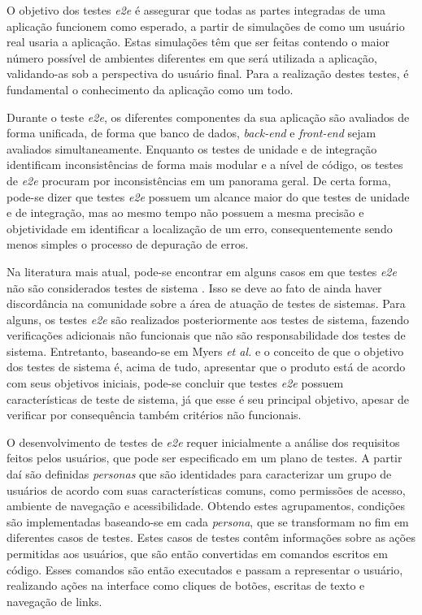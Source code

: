 O objetivo dos testes \emph{e2e} é assegurar que todas as partes integradas de uma aplicação funcionem como esperado, a partir de simulações de como um usuário real usaria a aplicação. Estas simulações têm que ser feitas contendo o maior número possível de ambientes diferentes em que será utilizada a aplicação, validando-as sob a perspectiva do usuário final. Para a realização destes testes, é fundamental o conhecimento da aplicação como um todo.

Durante o teste \emph{e2e}, os diferentes componentes da sua aplicação são avaliados de forma unificada, de forma que banco de dados, \emph{back-end} e \emph{front-end} sejam avaliados simultaneamente. Enquanto os testes de unidade e de integração identificam inconsistências de forma mais modular e a nível de código, os testes de \emph{e2e} procuram por inconsistências em um panorama geral. De certa forma, pode-se dizer que testes \emph{e2e} possuem um alcance maior do que testes de unidade e de integração, mas ao mesmo tempo não possuem a mesma precisão e objetividade em identificar a localização de um erro, consequentemente sendo menos simples o processo de depuração de erros.

Na literatura mais atual, pode-se encontrar em alguns casos em que testes \emph{e2e} não são considerados testes de sistema \cite{chowdhury}. Isso se deve ao fato de ainda haver discordância na comunidade sobre a área de atuação de testes de sistemas. Para alguns, os testes \emph{e2e} são realizados posteriormente aos testes de sistema, fazendo verificações adicionais não funcionais que não são responsabilidade dos testes de sistema. Entretanto, baseando-se em Myers \emph{et al.} \cite{myers} e o conceito de que o objetivo dos testes de sistema é, acima de tudo, apresentar que o produto está de acordo com seus objetivos iniciais, pode-se concluir que testes \emph{e2e} possuem características de teste de sistema, já que esse é seu principal objetivo, apesar de verificar por consequência também critérios não funcionais.

O desenvolvimento de testes de \emph{e2e} requer inicialmente a análise dos requisitos feitos pelos usuários, que pode ser especificado em um plano de testes. A partir daí são definidas \emph{personas} que são identidades para caracterizar um grupo de usuários de acordo com suas características comuns, como permissões de acesso, ambiente de navegação e acessibilidade. Obtendo estes agrupamentos, condições são implementadas baseando-se em cada \emph{persona}, que se transformam no fim em diferentes casos de testes. Estes casos de testes contêm informações sobre as ações permitidas aos usuários, que são então convertidas em comandos escritos em código. Esses comandos são então executados e passam a representar o usuário, realizando ações na interface como cliques de botões, escritas de texto e navegação de links.

